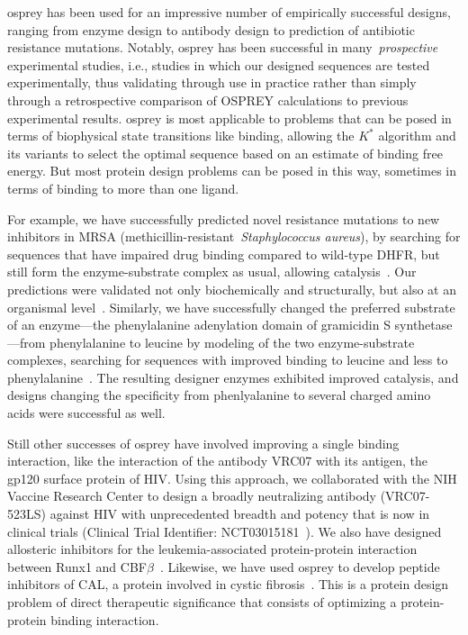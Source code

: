 
{\sc osprey} has been used for an impressive number of empirically successful designs, ranging from enzyme design to antibody design to prediction of antibiotic resistance mutations.  Notably, {\sc osprey} has been successful in many~\textit{prospective} experimental studies, i.e., studies in which our designed sequences are tested experimentally, thus validating \osprey through use in practice rather than simply through a retrospective comparison of OSPREY calculations to previous experimental results.  {\sc osprey} is most applicable to problems that can be posed in terms of biophysical state transitions like binding, allowing the $K^*$ algorithm and its variants to select the optimal sequence based on an estimate of binding free energy.  But most protein design problems can be posed in this way, sometimes in terms of binding to more than one ligand.  

For example, we have successfully predicted novel resistance mutations to new inhibitors in MRSA (methicillin-resistant~\textit{Staphylococcus aureus}), by searching for sequences that have impaired drug binding compared to wild-type DHFR, but still form the enzyme-substrate complex as usual, allowing catalysis~\cite{DHFR-PNAS,DHFR-PNAS2}.  Our predictions were validated not only biochemically and structurally, but also at an organismal level~\cite{DHFR-PNAS2, mimb_resistance}.  Similarly, we have successfully changed the preferred substrate of an enzyme---the phenylalanine adenylation domain of gramicidin S synthetase---from phenylalanine to leucine by modeling of the two enzyme-substrate complexes, searching for sequences with improved binding to leucine and less to phenylalanine~\cite{GrsA-LeuA}.  The resulting designer enzymes exhibited improved catalysis, and designs changing the specificity from phenlyalanine to several charged amino acids were successful as well.  

Still other successes of {\sc osprey} have involved improving a single binding interaction, like the interaction of the antibody VRC07 with its antigen, the gp120 surface protein of HIV.  Using this approach, we collaborated with the NIH Vaccine Research Center to design a broadly neutralizing antibody (VRC07-523LS) against HIV with unprecedented breadth and potency that is now in clinical trials (Clinical Trial Identifier: NCT03015181~\cite{VRC07_enhance,clinical605}).  We also have designed allosteric inhibitors for the leukemia-associated protein-protein interaction between Runx1 and CBF$\beta$~\cite{runx1_cbfb}.  Likewise, we have used {\sc osprey} to develop peptide inhibitors of CAL, a protein involved in cystic fibrosis~\cite{CFTR}.  This is a protein design problem of direct therapeutic significance that consists of optimizing a protein-protein binding interaction.  

